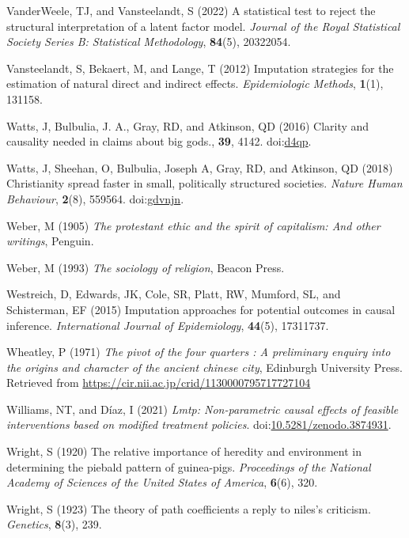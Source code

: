 \documentclass[
  singlecolumn,
  9pt]{article}
\newlength{\cslhangindent}
\newenvironment{CSLReferences}[2] %
 {\begin{list}{}{%
  \setlength{\itemindent}{0pt}
  \setlength{\leftmargin}{0pt}
  \setlength{\parsep}{0pt}
  \ifodd #1
   \setlength{\leftmargin}{\cslhangindent}
   \setlength{\itemindent}{-1\cslhangindent}
  \fi
  \setlength{\itemsep}{#2\baselineskip}}}
 {\end{list}}
\begin{document}
\begin{CSLReferences}{1}{0}
VanderWeele, TJ, and Vansteelandt, S (2022) A statistical test to reject
the structural interpretation of a latent factor model. \emph{Journal of
the Royal Statistical Society Series B: Statistical Methodology},
\textbf{84}(5), 20322054.

Vansteelandt, S, Bekaert, M, and Lange, T (2012) Imputation strategies
for the estimation of natural direct and indirect effects.
\emph{Epidemiologic Methods}, \textbf{1}(1), 131158.

Watts, J, Bulbulia, J. A., Gray, RD, and Atkinson, QD (2016) Clarity and
causality needed in claims about big gods., \textbf{39}, 4142.
doi:\href{https://doi.org/d4qp}{d4qp}.

Watts, J, Sheehan, O, Bulbulia, Joseph A, Gray, RD, and Atkinson, QD
(2018) Christianity spread faster in small, politically structured
societies. \emph{Nature Human Behaviour}, \textbf{2}(8), 559564.
doi:\href{https://doi.org/gdvnjn}{gdvnjn}.

Weber, M (1905) \emph{The protestant ethic and the spirit of capitalism:
And other writings}, Penguin.

Weber, M (1993) \emph{The sociology of religion}, Beacon Press.

Westreich, D, Edwards, JK, Cole, SR, Platt, RW, Mumford, SL, and
Schisterman, EF (2015) Imputation approaches for potential outcomes in
causal inference. \emph{International Journal of Epidemiology},
\textbf{44}(5), 17311737.

Wheatley, P (1971) \emph{The pivot of the four quarters : A preliminary
enquiry into the origins and character of the ancient chinese city},
Edinburgh University Press. Retrieved from
\url{https://cir.nii.ac.jp/crid/1130000795717727104}

Williams, NT, and Díaz, I (2021) \emph{Lmtp: Non-parametric causal
effects of feasible interventions based on modified treatment policies}.
doi:\href{https://doi.org/10.5281/zenodo.3874931}{10.5281/zenodo.3874931}.

Wright, S (1920) The relative importance of heredity and environment in
determining the piebald pattern of guinea-pigs. \emph{Proceedings of the
National Academy of Sciences of the United States of America},
\textbf{6}(6), 320.

Wright, S (1923) The theory of path coefficients a reply to niles's
criticism. \emph{Genetics}, \textbf{8}(3), 239.

\end{CSLReferences}
\end{document}
